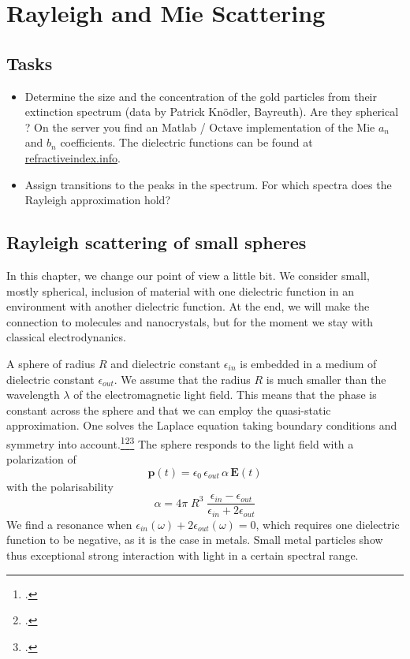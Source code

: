 \renewcommand{\lastmod}{April 27, 2020}


\chapter{Rayleigh and Mie Scattering}





\section{Tasks}

\begin{itemize}
\item Determine the size and the concentration of the gold particles from their extinction spectrum (data by Patrick Knödler, Bayreuth). Are they spherical ? On the server you find an Matlab / Octave implementation of the Mie $a_n$ and $b_n$ coefficients. The dielectric functions can be found at \href{https://refractiveindex.info/}{refractiveindex.info}.

\item Assign transitions to the peaks in the spectrum. For which spectra does the Rayleigh approximation hold?


\end{itemize}


\section{Rayleigh scattering of small spheres}


In this chapter, we change our point of view a little bit. We consider small, mostly spherical, inclusion of material with one dielectric function in an environment with another dielectric function. At the end, we will make the connection to molecules and nanocrystals, but for the moment we stay with classical electrodynanics.


A sphere of radius $R$ and dielectric constant $\epsilon_{in}$ is embedded in a medium of dielectric constant $\epsilon_{out}$. We assume that the radius $R$ is much smaller than the wavelength $\lambda$ of the electromagnetic light field. This means that the phase is constant across the sphere and that we can employ the quasi-static approximation. One solves the Laplace equation taking  boundary conditions and symmetry into account.\footcite{Jackson-ED}\footcite[excercise 2.4.2]{Nolting-ED}\footcite[chapter 5.2]{BH-book}
The sphere responds to the light field with a polarization of
\begin{equation}
 \mathbf{p}(t) = \epsilon_0 \,  \epsilon_{out} \, \alpha \, \mathbf{E}(t)
\end{equation}
with the polarisability
\begin{equation}
 \alpha = 4 \pi  \; R^3 \; \frac{\epsilon_{in} - \epsilon_{out}}{\epsilon_{in} + 2 \epsilon_{out}}
\end{equation}
We find a resonance when $\epsilon_{in}(\omega) + 2 \epsilon_{out}(\omega) = 0$, which requires one dielectric function to be negative, as it is the case in metals. Small metal particles show thus exceptional strong interaction with light in a certain spectral range.


